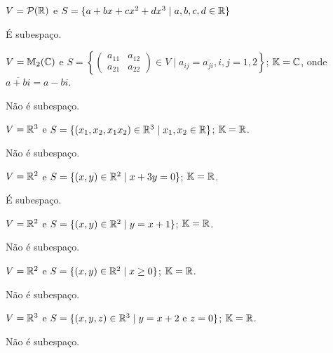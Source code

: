\documentclass[12pt]{exam}
\begin{document}
\begin{exercicio}
    $V = \mathcal{P}(\mathbb{R})$ e $S = \{a + bx + cx^2 + dx^3\mid a, b, c, d \in \mathbb{R}\}$
    \begin{solucao}
      É subespaço.
    \end{solucao}
\end{exercicio}

\begin{exercicio}
  $V = \mathbb{M}_2(\mathbb{C})$ e $S = \left\{\begin{pmatrix} a_{11} & a_{12}\\ a_{21} & a_{22}\end{pmatrix} \in V \mid a_{ij} = \overline{a_{ji}}, i, j = 1, 2\right\}$; $\mathbb{K} = \mathbb{C}$, onde $\overline{a + bi} = a - bi$.
  \begin{solucao}
    N\~ao \'e subespa\c{c}o.
  \end{solucao}
\end{exercicio}

\begin{exercicio}
  $V = \mathbb{R}^3$ e $S = \{(x_1, x_2, x_1x_2) \in \mathbb{R}^3 \mid x_1, x_2 \in \mathbb{R}\}$; $\mathbb{K} = \mathbb{R}$.
  \begin{solucao}
    N\~ao \'e subespa\c{c}o.
  \end{solucao}
\end{exercicio}

\begin{exercicio}
  $V = \mathbb{R}^2$ e $S = \{(x, y) \in \mathbb{R}^2 \mid x + 3y = 0\}$; $\mathbb{K} = \mathbb{R}$.
  \begin{solucao}
    \'E subespa\c{c}o.
  \end{solucao}
\end{exercicio}

\begin{exercicio}
  $V = \mathbb{R}^2$ e $S = \{(x, y) \in \mathbb{R}^2 \mid y = x + 1\}$; $\mathbb{K} = \mathbb{R}$.
  \begin{solucao}
    N\~ao \'e subespa\c{c}o.
  \end{solucao}
\end{exercicio}

\begin{exercicio}
  $V = \mathbb{R}^2$ e $S = \{(x, y) \in \mathbb{R}^2 \mid x \ge 0\}$; $\mathbb{K} = \mathbb{R}$.
  \begin{solucao}
    N\~ao \'e subespa\c{c}o.
  \end{solucao}
\end{exercicio}

\begin{exercicio}
  $V = \mathbb{R}^3$ e $S = \{(x, y, z) \in \mathbb{R}^3 \mid y = x + 2 \mbox{ e } z = 0\}$; $\mathbb{K} = \mathbb{R}$.
  \begin{solucao}
    N\~ao \'e subespa\c{c}o.
  \end{solucao}
\end{exercicio}
\end{document}
